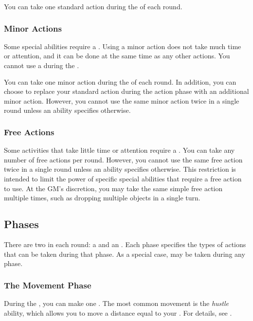             You can take one standard action during the  of each round.

        \subsubsection{Minor Actions}\label{Minor Actions}
            Some special abilities require a .
            Using a minor action does not take much time or attention, and it can be done at the same time as any other actions.
            You cannot use a  during the .

            You can take one minor action during the  of each round.
            In addition, you can choose to replace your standard action during the action phase with an additional minor action.
            However, you cannot use the same minor action twice in a single round unless an ability specifies otherwise.

        \subsubsection{Free Actions}\label{Free Actions}
            Some activities that take little time or attention require a .
            You can take any number of free actions per round.
            However, you cannot use the same free action twice in a single round unless an ability specifies otherwise.
            This restriction is intended to limit the power of specific special abilities that require a free action to use.
            At the GM's discretion, you may take the same simple free action multiple times, such as dropping multiple objects in a single turn.

    \subsection{Phases}\label{Phases}

        There are two  in each round: a  and an .
        Each phase specifies the types of actions that can be taken during that phase.
        As a special case,  may be taken during any phase.

        \subsubsection{The Movement Phase}\label{The Movement Phase}
            During the , you can make one .
            The most common movement is the \textit{hustle} ability, which allows you to move a distance equal to your .
            For details, see .


